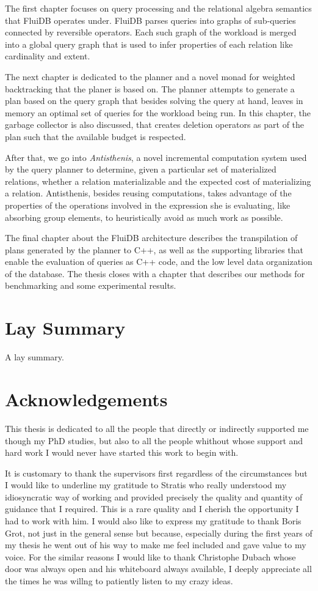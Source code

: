 \begin{precontent}
The first chapter focuses on query processing and the relational
algebra semantics that FluiDB operates under. FluiDB parses queries
into graphs of sub-queries connected by reversible operators. Each
such graph of the workload is merged into a global query graph that is
used to infer properties of each relation like cardinality and
extent.

The next chapter is dedicated to the planner and a novel monad for
weighted backtracking that the planer is based on. The planner
attempts to generate a plan based on the query graph that besides
solving the query at hand, leaves in memory an optimal set of queries
for the workload being run. In this chapter, the garbage collector is
also discussed, that creates deletion operators as part of the plan
such that the available budget is respected.

After that, we go into \emph{Antisthenis}, a novel incremental
computation system used by the query planner to determine, given a
particular set of materialized relations, whether a relation
materializable and the expected cost of materializing a
relation. Antisthenis, besides reusing computations, takes advantage
of the properties of the operations involved in the expression she is
evaluating, like absorbing group elements, to heuristically avoid as
much work as possible.

The final chapter about the FluiDB architecture describes the
transpilation of plans generated by the planner to C++, as well as the
supporting libraries that enable the evaluation of queries as C++
code, and the low level data organization of the database. The thesis
closes with a chapter that describes our methods for benchmarking and
some experimental results.


\chapter{Lay Summary}%
A lay summary.

\chapter{Acknowledgements}%

This thesis is dedicated to all the people that directly or indirectly
supported me though my PhD studies, but also to all the people
whithout whose support and hard work I would never have started this
work to begin with.

It is customary to thank the supervisors first regardless of the
circumstances but I would like to underline my gratitude to Stratis
who really understood my idiosyncratic way of working and provided
precisely the quality and quantity of guidance that I required. This
is a rare quality and I cherish the opportunity I had to work with
him. I would also like to express my gratitude to thank Boris Grot,
not just in the general sense but because, especially during the first
years of my thesis he went out of his way to make me feel included and
gave value to my voice. For the similar reasons I would like to thank
Christophe Dubach whose door was always open and his whiteboard always
available, I deeply appreciate all the times he was willng to
patiently listen to my crazy ideas.


\end{precontent}
